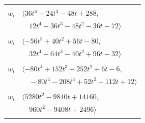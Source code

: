 \documentclass[11pt]{article}
\begin{document}
\begin{longtable}{@{}ll@{}}
\addlinespace[2pt]
\multicolumn{2}{@{}p{0.97\textwidth}@{}}{$i=59$, $D_i=1$, $\rho_{ij}$: $0{:}1, \allowbreak 3{:}1, \allowbreak 13{:}1, \allowbreak 17{:}1, \allowbreak 32{:}1, \allowbreak 36{:}3, \allowbreak 37{:}3, \allowbreak 42{:}1, \allowbreak 44{:}2, \allowbreak 45{:}1, \allowbreak 53{:}2, \allowbreak 56{:}1, \allowbreak 62{:}2, \allowbreak 63{:}2, \allowbreak 65{:}3, \allowbreak 66{:}2, \allowbreak 76{:}3$}\\
$w_i$ & $\langle 36t^{4}-24t^{3}-48t+288,$\\
 & $\quad 12t^{4}-36t^{3}-48t^{2}-36t-72\rangle$\\
\addlinespace[2pt]
\multicolumn{2}{@{}p{0.97\textwidth}@{}}{$i=60$, $D_i=1$, $e_i=0$, $\rho_{ij}$: $3{:}3, \allowbreak 4{:}2, \allowbreak 6{:}1, \allowbreak 7{:}2, \allowbreak 12{:}2, \allowbreak 24{:}3, \allowbreak 34{:}1, \allowbreak 37{:}3, \allowbreak 40{:}2, \allowbreak 47{:}2, \allowbreak 56{:}1$}\\
$w_i$ & $\langle -56t^{3}+40t^{2}+56t-80,$\\
 & $\quad 32t^{4}-64t^{3}-40t^{2}+96t-32\rangle$\\
\addlinespace[2pt]
\multicolumn{2}{@{}p{0.97\textwidth}@{}}{$i=61$, $D_i=2$, $\rho_{ij}$: $2{:}3, \allowbreak 7{:}3, \allowbreak 17{:}1, \allowbreak 19{:}3, \allowbreak 41{:}1, \allowbreak 44{:}1, \allowbreak 45{:}3, \allowbreak 62{:}1, \allowbreak 63{:}3, \allowbreak 64{:}1, \allowbreak 73{:}3$}\\
$w_i$ & $\langle -80t^{4}+152t^{3}+252t^{2}+6t-6,$\\
 & $\quad -80t^{4}-208t^{3}+52t^{2}+112t+12\rangle$\\
\addlinespace[2pt]
\multicolumn{2}{@{}p{0.97\textwidth}@{}}{$i=62$, $D_i=1$, $\rho_{ij}$: $25{:}1, \allowbreak 27{:}2, \allowbreak 28{:}3, \allowbreak 34{:}1, \allowbreak 36{:}2, \allowbreak 43{:}2, \allowbreak 49{:}3, \allowbreak 51{:}2, \allowbreak 59{:}2, \allowbreak 61{:}3, \allowbreak 67{:}2, \allowbreak 68{:}3, \allowbreak 72{:}3$}\\
$w_i$ & $\langle 5280t^{2}-9840t+14160,$\\
 & $\quad 960t^{2}-9408t+2496\rangle$\\
\addlinespace[2pt]
\multicolumn{2}{@{}p{0.97\textwidth}@{}}{$i=63$, $D_i=1$, $\rho_{ij}$: $2{:}1, \allowbreak 8{:}2, \allowbreak 24{:}3, \allowbreak 27{:}1, \allowbreak 28{:}1, \allowbreak 31{:}1, \allowbreak 36{:}3, \allowbreak 38{:}2, \allowbreak 39{:}2, \allowbreak 44{:}1, \allowbreak 46{:}1, \allowbreak 49{:}3, \allowbreak 51{:}2, \allowbreak 56{:}1, \allowbreak 59{:}2, \allowbreak 61{:}1, \allowbreak 65{:}2, \allowbreak 77{:}1$}\\

\end{longtable}
\end{document}
